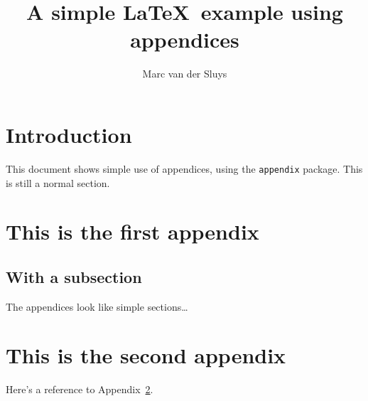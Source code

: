 \documentclass[11pt]{article}
\title{A simple \LaTeX\ example using appendices}
\author{Marc van der Sluys}
\begin{document}
\maketitle

\tableofcontents


\section{Introduction}

This document shows simple use of appendices, using the \texttt{appendix} package.  This is still a normal section.



\begin{appendices}  %
  \section{This is the first appendix}
  \label{app:firstApp}
  
  \subsection*{With a subsection}
  
  The appendices look like simple sections\ldots
  
  
  \section{This is the second appendix}
  Here's a reference to Appendix~\ref{app:firstApp}.
  
\end{appendices}
\end{document}
